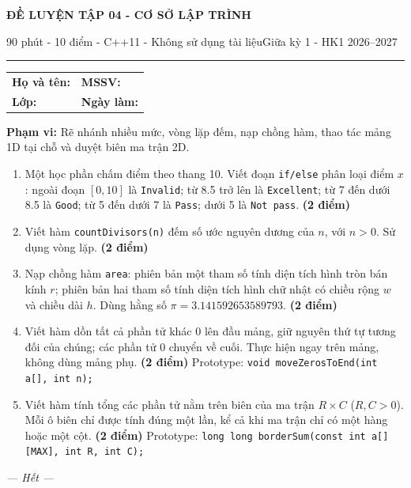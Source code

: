 \documentclass[11pt,a4paper]{article}
\newcommand{\examtitle}[4]{\begin{center}{\Large\bfseries\color{hcmusblue}#1}\par\vspace{3pt}{\large\bfseries #2}\par\vspace{3pt}\small #3\quad\textbullet\quad #4\end{center}\vspace{5pt}\hrule\vspace{8pt}}
\newcommand{\studentline}{\begin{tabularx}{\textwidth}{X X}\textbf{Họ và tên:} \hrulefill & \textbf{MSSV:} \hrulefill\\[7pt]\textbf{Lớp:} \hrulefill & \textbf{Ngày làm:} \hrulefill\end{tabularx}\vspace{8pt}}
\newcommand{\points}[1]{\hfill\textbf{(#1 điểm)}}
\begin{document}
\examtitle{ĐỀ LUYỆN TẬP 04 - CƠ SỞ LẬP TRÌNH}{CƠ SỞ LẬP TRÌNH - HCMUS (theo lịch học tuần 1--5)}{90 phút - 10 điểm - C++11 - Không sử dụng tài liệu}{Giữa kỳ 1 - HK1 2026--2027}

\studentline
\begin{notebox}\textbf{Phạm vi:} Rẽ nhánh nhiều mức, vòng lặp đếm, nạp chồng hàm, thao tác mảng 1D tại chỗ và duyệt biên ma trận 2D.\end{notebox}
\begin{enumerate}
\item Một học phần chấm điểm theo thang 10. Viết đoạn \texttt{if/else} phân loại điểm $x$: ngoài đoạn $[0,10]$ là \texttt{Invalid}; từ 8.5 trở lên là \texttt{Excellent}; từ 7 đến dưới 8.5 là \texttt{Good}; từ 5 đến dưới 7 là \texttt{Pass}; dưới 5 là \texttt{Not pass}. \points{2}
\item Viết hàm \texttt{countDivisors(n)} đếm số ước nguyên dương của $n$, với $n>0$. Sử dụng vòng lặp. \points{2}
\item Nạp chồng hàm \texttt{area}: phiên bản một tham số tính diện tích hình tròn bán kính $r$; phiên bản hai tham số tính diện tích hình chữ nhật có chiều rộng $w$ và chiều dài $h$. Dùng hằng số $\pi=3.141592653589793$. \points{2}
\item Viết hàm dồn tất cả phần tử khác 0 lên đầu mảng, giữ nguyên thứ tự tương đối của chúng; các phần tử 0 chuyển về cuối. Thực hiện ngay trên mảng, không dùng mảng phụ. \points{2}
Prototype: \texttt{void moveZerosToEnd(int a[], int n);}
\item Viết hàm tính tổng các phần tử nằm trên biên của ma trận $R\times C$ ($R,C>0$). Mỗi ô biên chỉ được tính đúng một lần, kể cả khi ma trận chỉ có một hàng hoặc một cột. \points{2}
Prototype: \texttt{long long borderSum(const int a[][MAX], int R, int C);}
\end{enumerate}
\vfill\begin{center}\textit{--- Hết ---}\end{center}
\end{document}
